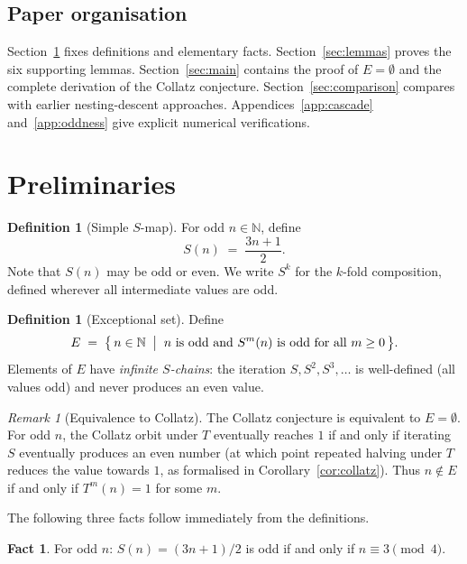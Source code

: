 \documentclass{amsart}
\theoremstyle{definition}
\newtheorem{definition}[theorem]{Definition}
\newtheorem{fact}[theorem]{Fact}
\theoremstyle{remark}
\newtheorem{remark}[theorem]{Remark}
\newcommand{\N}{\mathbb{N}}
\begin{document}
\subsection*{Paper organisation}

Section~\ref{sec:prelim} fixes definitions and elementary facts.
Section~\ref{sec:lemmas} proves the six supporting lemmas.
Section~\ref{sec:main} contains the proof of $E=\emptyset$ and the complete
derivation of the Collatz conjecture.
Section~\ref{sec:comparison} compares with earlier nesting-descent approaches.
Appendices~\ref{app:cascade} and~\ref{app:oddness} give explicit numerical
verifications.

\section{Preliminaries}
\label{sec:prelim}

\begin{definition}[Simple $S$-map]
For odd $n\in\N$, define
\[
  S(n) \;=\; \frac{3n+1}{2}.
\]
Note that $S(n)$ may be odd or even.
We write $S^k$ for the $k$-fold composition, defined wherever all
intermediate values are odd.
\end{definition}

\begin{definition}[Exceptional set]
Define
\[
  E \;=\; \bigl\{\, n\in\N \;\bigm|\;
          n \text{ is odd and } S^m(n) \text{ is odd for all } m\ge 0\,\bigr\}.
\]
Elements of $E$ have \emph{infinite $S$-chains}: the iteration
$S, S^2, S^3,\ldots$ is well-defined (all values odd) and never produces an
even value.
\end{definition}

\begin{remark}[Equivalence to Collatz]
\label{rem:equiv}
The Collatz conjecture is equivalent to $E=\emptyset$.
For odd $n$, the Collatz orbit under $T$ eventually reaches $1$ if and only
if iterating $S$ eventually produces an even number (at which point repeated
halving under $T$ reduces the value towards $1$, as formalised in
Corollary~\ref{cor:collatz}).
Thus $n\notin E$ if and only if $T^m(n)=1$ for some $m$.
\end{remark}

The following three facts follow immediately from the definitions.

\begin{fact}
\label{fact:parity}
For odd $n$: $S(n)=(3n+1)/2$ is odd if and only if $n\equiv 3\pmod{4}$.
\end{fact}
\end{document}
